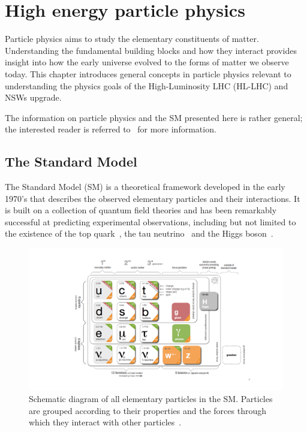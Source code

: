 
\chapter{High energy particle physics}
\label{chap:hep}

Particle physics aims to study the elementary constituents of matter. Understanding the fundamental building blocks and how they interact provides insight into how the early universe evolved to the forms of matter we observe today. This chapter introduces general concepts in particle physics relevant to understanding the physics goals of the High-Luminosity LHC (HL-LHC) and NSWs upgrade. 

The information on particle physics and the SM presented here is rather general; the interested reader is referred to~\cite{griffiths_introduction_2011, peskin_introduction_1995, zyla_review_2020} for more information. 

\section{The Standard Model}

The Standard Model (SM) is a theoretical framework developed in the early 1970's that describes the observed elementary particles and their interactions.  It is built on a collection of quantum field theories and has been remarkably successful at predicting experimental observations, including but not limited to the existence of the top quark~\cite{kobayashi_cp-violation_1973}, the tau neutrino~\cite{perl_evidence_1975} and the Higgs boson~\cite{englert_broken_1964, higgs_broken_1964}. 

\begin{figure}
    \centering
    \includegraphics[width = \textwidth]{figures/standardmodel_galbraith_carsten.pdf}
    \caption{Schematic diagram of all elementary particles in the SM.  Particles are grouped according to their properties and the forces through which they interact with other particles~\cite{galbraith_ux_2013}.}
    \label{fig:standard_model}
\end{figure}

